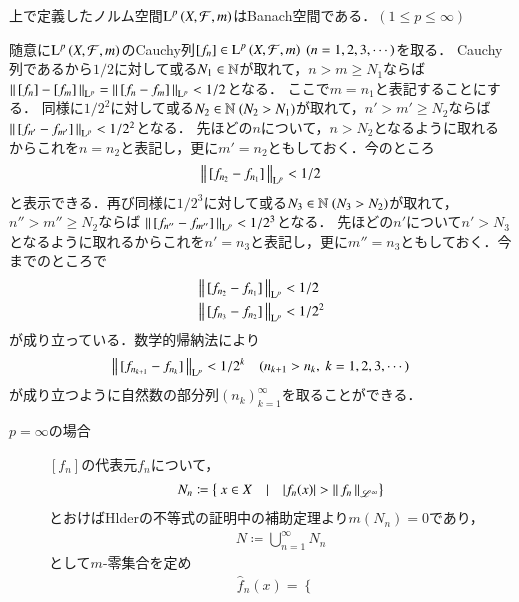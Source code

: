 \begin{prp}
	上で定義したノルム空間$\operatorname{L}^{p} \left(X,\mathcal{F},m\right)$はBanach空間である．$(1 \leq p \leq \infty)$
\end{prp}
\begin{prf}
	随意に$\operatorname{L}^{p} \left(X,\mathcal{F},m\right)$のCauchy列$[f_n] \in \Lp{p}{X,\mathcal{F},m}\ (n=1,2,3,\cdots)$を取る．
	Cauchy列であるから$1/2$に対して或る$N_1 \in \mathbb{N}$が取れて，$n>m \geq N_1$ならば
	$\left\|\, [f_n]-[f_m]\, \right\|_{\mathrm{L}^p} = \left\|\, [f_n - f_m]\, \right\|_{\mathrm{L}^p} < 1/2$となる．
	ここで$m = n_1$と表記することにする．
	同様に$1/2^2$に対して或る$N_2 \in \mathbb{N}\ (N_2 > N_1)$が取れて，$n'>m' \geq N_2$ならば
	$\left\|\, [f_{n'} - f_{m'}]\, \right\|_{\mathrm{L}^p} < 1/2^2$となる．
	先ほどの$n$について，$n > N_2$となるように取れるからこれを$n = n_2$と表記し，更に$m' = n_2$ともしておく．今のところ
	\begin{align}
		\left\|\, [f_{n_2} - f_{n_1}]\, \right\|_{\mathrm{L}^p} < 1/2
	\end{align}
	と表示できる．再び同様に$1/2^3$に対して或る$N_3 \in \mathbb{N}\ (N_3 > N_2)$が取れて，$n''>m'' \geq N_2$ならば
	$\left\|\, [f_{n''} - f_{m''}]\, \right\|_{\mathrm{L}^p} < 1/2^3$となる．
	先ほどの$n'$について$n' > N_3$となるように取れるからこれを$n' = n_3$と表記し，更に$m'' = n_3$ともしておく．今までのところで
	\begin{align}
		&\left\|\, [f_{n_2} - f_{n_1}]\, \right\|_{\mathrm{L}^p} < 1/2 \\
		&\left\|\, [f_{n_3} - f_{n_2}]\, \right\|_{\mathrm{L}^p} < 1/2^2
	\end{align}
	が成り立っている．数学的帰納法により
	\begin{align}
		\left\|\, [f_{n_{k+1}} - f_{n_k}]\, \right\|_{\mathrm{L}^p} < 1/2^k \quad (n_{k+1} > n_k,\ k=1,2,3,\cdots)
	\end{align}
	が成り立つように自然数の部分列$(n_k)_{k=1}^{\infty}$を取ることができる．
	\begin{description}
		\item[$p = \infty$の場合]
			$[f_n]$の代表元$f_n$について，
			\begin{align}
				N_n \coloneqq \left\{\ x \in X\quad |\quad |f_n(x)| > \left\|\, f_n\, \right\|_{\mathscr{L}^\infty} \right\}
			\end{align}
			とおけばHlderの不等式の証明中の補助定理より$m(N_n) = 0$であり，
			\begin{align}
				N \coloneqq \bigcup_{n=1}^{\infty} N_n
			\end{align}
			として$m$-零集合を定め
			\begin{align}
				\hat{f}_n(x) =
				\begin{cases}

\end{cases}
\end{align}
\end{description}
\end{prf}
